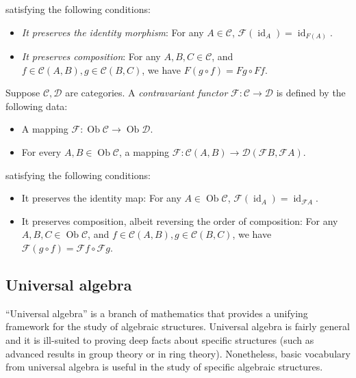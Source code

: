 \documentclass{ucetd}
\begin{document}
satisfying the following conditions:

\begin{itemize}
\item {\em It preserves the identity morphism}: For any $A \in
  \mathcal{C}$, $\mathcal{F}(\operatorname{id}_A) =
  \operatorname{id}_{F(A)}$.
\item {\em It preserves composition}: For any $A,B,C \in \mathcal{C}$,
  and $f \in \mathcal{C}(A,B), g \in \mathcal{C}(B,C)$, we have $F(g
  \circ f) = Fg \circ Ff$.
\end{itemize}

Suppose $\mathcal{C}, \mathcal{D}$ are categories. A {\em contravariant
functor} $\mathcal{F}:\mathcal{C} \to \mathcal{D}$ is defined by the
following data:

\begin{itemize}
\item A mapping $\mathcal{F}: \operatorname{Ob}\mathcal{C} \to
  \operatorname{Ob}\mathcal{D}$.
\item For every $A,B \in \operatorname{Ob}\mathcal{C}$, a mapping
  $\mathcal{F}: \mathcal{C}(A,B) \to
  \mathcal{D}(\mathcal{F}B,\mathcal{F}A)$.
\end{itemize}

satisfying the following conditions:

\begin{itemize}
\item It preserves the identity map: For any $A \in
  \operatorname{Ob}\mathcal{C}$, $\mathcal{F}(\operatorname{id}_A) =
  \operatorname{id}_{\mathcal{F}A}$.
\item It preserves composition, albeit reversing the order of
  composition: For any $A,B,C \in \operatorname{Ob}\mathcal{C}$, and
  $f \in \mathcal{C}(A,B), g \in \mathcal{C}(B,C)$, we have
  $\mathcal{F}(g \circ f) = \mathcal{F}f \circ \mathcal{F}g$.
\end{itemize}

\subsection{Universal algebra}\label{appsec:univalg-basic}

``Universal algebra'' is a branch of mathematics that provides a
unifying framework for the study of algebraic structures. Universal
algebra is fairly general and it is ill-suited to proving deep facts
about specific structures (such as advanced results in group theory or
in ring theory). Nonetheless, basic vocabulary from universal algebra
is useful in the study of specific algebraic structures.
\end{document}
